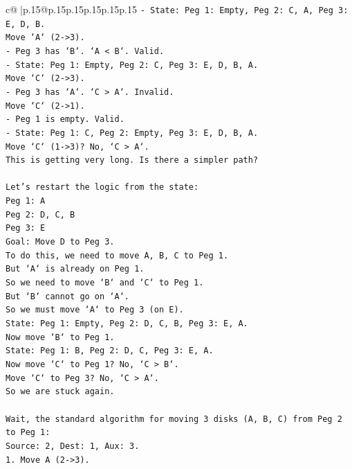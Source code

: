 \documentclass{article}
\begin{document}
{\begin{supertabular}{c@{$\;$}|p{.15\linewidth}@{}p{.15\linewidth}p{.15\linewidth}p{.15\linewidth}p{.15\linewidth}p{.15\linewidth}}
{{{\texttt{{-} State: Peg 1: Empty, Peg 2: C, A, Peg 3: E, D, B.} \\
\texttt{Move `A` (2{-}>3).} \\
\texttt{{-} Peg 3 has `B`. `A < B`. Valid.} \\
\texttt{{-} State: Peg 1: Empty, Peg 2: C, Peg 3: E, D, B, A.} \\
\texttt{Move `C` (2{-}>3).} \\
\texttt{{-} Peg 3 has `A`. `C > A`. Invalid.} \\
\texttt{Move `C` (2{-}>1).} \\
\texttt{{-} Peg 1 is empty. Valid.} \\
\texttt{{-} State: Peg 1: C, Peg 2: Empty, Peg 3: E, D, B, A.} \\
\texttt{Move `C` (1{-}>3)? No, `C > A`.} \\
\texttt{This is getting very long. Is there a simpler path?} \\
\\ 
\texttt{Let's restart the logic from the state:} \\
\texttt{Peg 1: A} \\
\texttt{Peg 2: D, C, B} \\
\texttt{Peg 3: E} \\
\texttt{Goal: Move D to Peg 3.} \\
\texttt{To do this, we need to move A, B, C to Peg 1.} \\
\texttt{But `A` is already on Peg 1.} \\
\texttt{So we need to move `B` and `C` to Peg 1.} \\
\texttt{But `B` cannot go on `A`.} \\
\texttt{So we must move `A` to Peg 3 (on E).} \\
\texttt{State: Peg 1: Empty, Peg 2: D, C, B, Peg 3: E, A.} \\
\texttt{Now move `B` to Peg 1.} \\
\texttt{State: Peg 1: B, Peg 2: D, C, Peg 3: E, A.} \\
\texttt{Now move `C` to Peg 1? No, `C > B`.} \\
\texttt{Move `C` to Peg 3? No, `C > A`.} \\
\texttt{So we are stuck again.} \\
\\ 
\texttt{Wait, the standard algorithm for moving 3 disks (A, B, C) from Peg 2 to Peg 1:} \\
\texttt{Source: 2, Dest: 1, Aux: 3.} \\
\texttt{1. Move A (2{-}>3).} \\
}}}
\end{supertabular}}
\end{document}
